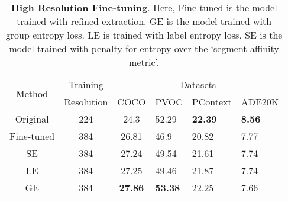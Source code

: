 
\begin{table}[htbp]
  \centering
  \begin{tabular}{c|c|c|l|l|l}
    \toprule
    \multirow{2}{*}{Method} & Training & \multicolumn{4}{c}{Datasets} \\
        
    \cline{3-6}
    & Resolution & COCO & PVOC & PContext & ADE20K \\

    \midrule
    Original & 224 & 24.3 & 52.29  & \textbf{22.39} & \textbf{8.56}\\
    \midrule
    Fine-tuned & 384  & 26.81 & 46.9 & 20.82 & 7.77\\
    \midrule
    SE  & 384  & 27.24 & 49.54 & 21.61 & 7.74 \\
    \midrule
    LE  & 384  & 27.25 & 49.46 & 21.87 & 7.74 \\
    \midrule
    GE  & 384  & \textbf{27.86} & \textbf{53.38}& 22.25 & 7.66 \\
    \bottomrule
  \end{tabular}
  \caption[\textbf{High Resolution Fine-tuning}]{\textbf{High Resolution Fine-tuning}. Here, Fine-tuned is the model trained with refined extraction. GE is the model trained with group entropy loss. LE is trained with label entropy loss. SE is the model trained with penalty for entropy over the `segment affinity metric'.}
 \label{tab:highres}
\end{table}
